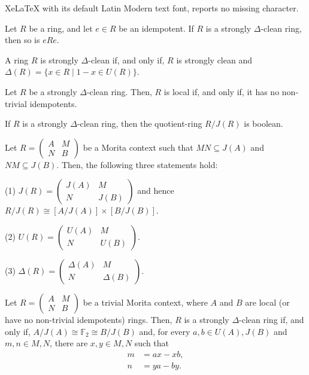 \documentclass[10pt,a4paper]{amsart}
\begin{document}
XeLaTeX with its default Latin Modern text font, reports no missing character.
\begin{corollary}\label{corner ring}
Let $R$ be a ring, and let $e \in R$ be an idempotent. If $R$ is a strongly $\Delta$-clean ring, then so is $eRe$.
\end{corollary}

\begin{theorem}\label{1}
A ring $R$ is strongly $\Delta$-clean if, and only if, $R$ is strongly clean and $\Delta(R) = \{ x \in R \mid 1 - x \in U(R) \}$.
\end{theorem}

\begin{lemma} \label{ni idempotent}
Let $R$ be a strongly $\Delta$-clean ring. Then, $R$ is local if, and only if, it has no non-trivial idempotents.
\end{lemma}

\begin{corollary}\label{booli}
If $R$ is a strongly $\Delta$-clean ring, then the quotient-ring $R/J(R)$ is boolean.
\end{corollary}

\begin{lemma}\label{rad morita}
Let $R = \begin{pmatrix}
A & M \\
N & B
\end{pmatrix}$ be a Morita context such that $MN \subseteq J(A)$ and $NM \subseteq J(B)$. Then, the following three statements hold:

(1) \quad  $J(R) = \begin{pmatrix}
    J(A) & M \\
    N & J(B)
    \end{pmatrix}$ and hence $R/J(R) \cong [A/J(A)] \times [B/J(B)]$.

(2)    $U(R) =\begin{pmatrix}
    U(A) & M \\
    N & U(B)
    \end{pmatrix}$.

(3)    $\Delta(R) =  \begin{pmatrix}
    \Delta(A) & M \\
    N & \Delta(B)
    \end{pmatrix}$.
\end{lemma}

\begin{theorem}\label{loc mori}
Let $R = \begin{pmatrix}
A & M \\
N & B
\end{pmatrix}$ be a trivial Morita context, where $A$ and $B$ are local (or have no non-trivial idempotents) rings. Then, $R$ is a strongly $\Delta$-clean ring if, and only if, $A/J(A) \cong  \mathbb{F}_2 \cong B/J(B)$ and, for every $a,b \in U(A),J(B)$ and $m,n \in M,N$, there are $x,y \in M,N$ such that
\begin{align*}
m &= ax - xb, \\
n &= ya - by.
\end{align*}
\end{theorem}
\end{document}
